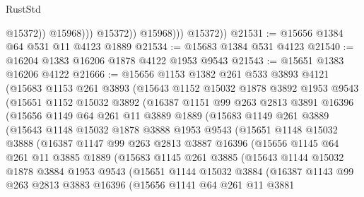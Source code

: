 \begin{lexlean}{RustStd}
\begin{coremodule}
                            @15372))
                        @15968)))
                  @15372))
              @15968)))
        @15372))
@21531 := @15656 @1384 @64 @531 @11 @4123 @1889
@21534 := @15683 @1384 @531 @4123
@21540 := @16204 @1383 @16206 @1878 @4122 @1953 @9543
@21543 := @15651 @1383 @16206 @4122
@21666 := @15656
    @1153
    @1382
    @261
    @533
    @3893
    @4121
    (@15683
      @1153
      @261
      @3893
      (@15643
        @1152
        @15032
        @1878
        @3892
        @1953
        @9543
        (@15651
          @1152
          @15032
          @3892
          (@16387
            @1151
            @99
            @263
            @2813
            @3891
            @16396
            (@15656
              @1149
              @64
              @261
              @11
              @3889
              @1889
              (@15683
                @1149
                @261
                @3889
                (@15643
                  @1148
                  @15032
                  @1878
                  @3888
                  @1953
                  @9543
                  (@15651
                    @1148
                    @15032
                    @3888
                    (@16387
                      @1147
                      @99
                      @263
                      @2813
                      @3887
                      @16396
                      (@15656
                        @1145
                        @64
                        @261
                        @11
                        @3885
                        @1889
                        (@15683
                          @1145
                          @261
                          @3885
                          (@15643
                            @1144
                            @15032
                            @1878
                            @3884
                            @1953
                            @9543
                            (@15651
                              @1144
                              @15032
                              @3884
                              (@16387
                                @1143
                                @99
                                @263
                                @2813
                                @3883
                                @16396
                                (@15656
                                  @1141
                                  @64
                                  @261
                                  @11
                                  @3881

\end{coremodule}
\end{lexlean}
